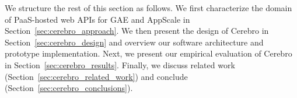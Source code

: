 
We structure the rest of this section as follows.
We first characterize the domain of 
PaaS-hosted web APIs for GAE and AppScale 
in Section~\ref{sec:cerebro_approach}.   
We then present the design of Cerebro in Section~\ref{sec:cerebro_design}
and overview our software architecture and prototype implementation.
Next, we
present our empirical evaluation of Cerebro in 
Section~\ref{sec:cerebro_results}.
Finally,  we discuss related work (Section~\ref{sec:cerebro_related_work}) and 
conclude (Section~\ref{sec:cerebro_conclusions}).
